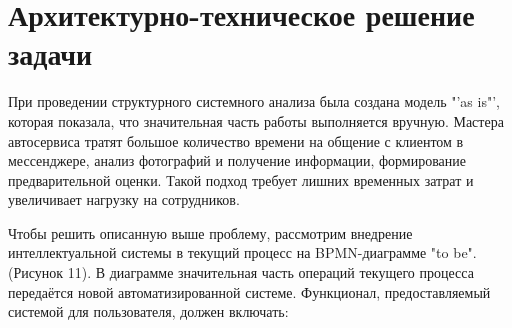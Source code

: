 \chapter{Архитектурно-техническое решение задачи}\label{ch:5}

При проведении структурного системного анализа была создана модель "'as is"', которая показала, что значительная часть работы выполняется вручную. Мастера автосервиса тратят большое количество времени на общение с клиентом в мессенджере, анализ фотографий и получение информации, формирование предварительной оценки. Такой подход требует лишних временных затрат и увеличивает нагрузку на сотрудников. 

Чтобы решить описанную выше проблему, рассмотрим внедрение интеллектуальной системы в текущий процесс на BPMN-диаграмме "to be". (Рисунок 11). В диаграмме значительная часть операций текущего процесса передаётся новой автоматизированной системе.
Функционал, предоставляемый системой для пользователя, должен включать:


